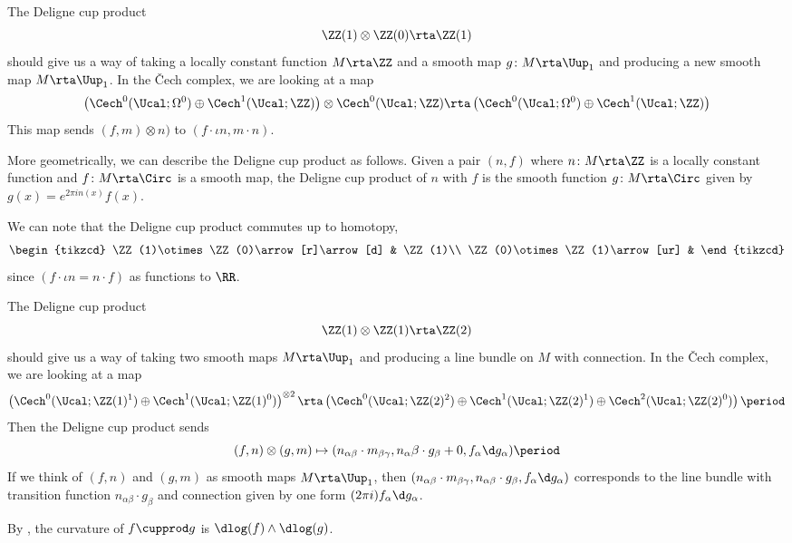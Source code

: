 \begin{example}
	The Deligne cup product
	\[
		\ZZ(1)\otimes\ZZ(0)\rta\ZZ(1)
	\]
	should give us a way of taking a locally constant function $M\rta \ZZ$ and a smooth map $g\colon M\rta \Uup_{1}$ and producing a new smooth map $M\rta \Uup_{1}$. In the Čech complex, we are looking at a map
	\[ 
		\left(\Cech^0(\Ucal;\Omega^0)\oplus \Cech^1(\Ucal;\ZZ)\right)\otimes\Cech^0(\Ucal;\ZZ)\rta \left(\Cech^0(\Ucal;\Omega^0)\oplus \Cech^1(\Ucal;\ZZ)\right)
	\]
	This map sends $(f,m)\otimes n)$ to $(f\cdot \iota n,m\cdot n)$.
\end{example}

More geometrically, we can describe the Deligne cup product as follows. 
Given a pair $(n,f)$ where $n\colon M\rta\ZZ$ is a locally constant function and $f\colon M\rta \Circ$ is a smooth map, the Deligne cup product of $n$ with $f$ is the smooth function $g\colon M\rta \Circ$ given by $g(x)=e^{2\pi i n(x)}f(x)$. 

\begin{remark}
	We can note that the Deligne cup product commutes up to homotopy,
	\begin{equation*}
		\begin{tikzcd}
			\ZZ(1)\otimes\ZZ(0)\arrow[r]\arrow[d] & \ZZ(1)\\
			\ZZ(0)\otimes\ZZ(1)\arrow[ur] & 
		\end{tikzcd}
	\end{equation*}
	since $(f\cdot \iota n=n\cdot f)$ as functions to $\RR$.
\end{remark}

\begin{example}
	The Deligne cup product
	\[
		\ZZ(1)\otimes\ZZ(1)\rta\ZZ(2)
	\]
	should give us a way of taking two smooth maps $M\rta \Uup_{1}$ and producing a line bundle on $M$ with connection. In the Čech complex, we are looking at a map
	\[
		\left(\Cech^0(\Ucal;\ZZ(1)^1)\oplus \Cech^1(\Ucal;\ZZ(1)^0)\right)^{\otimes 2}\rta\left(\Cech^0(\Ucal;\ZZ(2)^2)\oplus\Cech^1(\Ucal;\ZZ(2)^1)\oplus\Cech^2(\Ucal;\ZZ(2)^0)\right) \period
	\]
	Then the Deligne cup product sends 
	\[
		(f,n)\otimes(g,m)\mapsto(n_{\alpha\beta}\cdot m_{\beta\gamma},n_\alpha\beta\cdot g_\beta+0,f_\alpha \d g_\alpha) \period
	\]
	If we think of $(f,n)$ and $(g,m)$ as smooth maps $M\rta \Uup_{1}$, then $(n_{\alpha\beta}\cdot m_{\beta\gamma}, n_{\alpha\beta}\cdot g_\beta,f_\alpha \d g_\alpha)$ corresponds to the line bundle with transition function $n_{\alpha\beta}\cdot g_\beta$ and connection given by one form $(2\pi i)f_\alpha \d g_\alpha$.

	By \cite[Lemma 1.3.1]{Beilinson}, the curvature of $f\cupprod g$ is $\dlog (f)\wedge\dlog(g)$.
\end{example}
